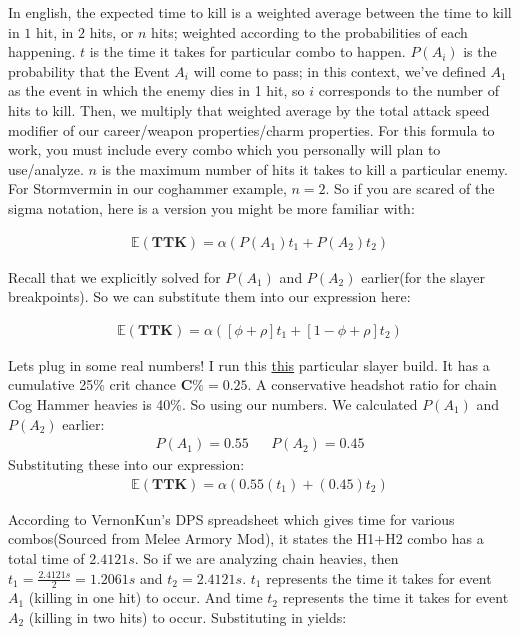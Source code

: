 \documentclass{article}
\begin{document}
In english, the expected time to kill is a weighted average between the time to kill in $1$ hit, in $2$ hits, or $n$ hits; weighted according to the probabilities of each happening. $t$ is the time it takes for particular combo to happen. $P(A_i)$ is the probability that the Event $A_i$ will come to pass; in this context, we've defined $A_1$ as the event in which the enemy dies in 1 hit, so $i$ corresponds to the number of hits to kill. Then, we multiply that weighted average by the total attack speed modifier of our career/weapon properties/charm properties. For this formula to work, you must include every combo which you personally will plan to use/analyze. $n$ is the maximum number of hits it takes to kill a particular enemy. For Stormvermin in our coghammer example, $n=2$. So if you are scared of the sigma notation, here is a version you might be more familiar with:

\begin{align*}
\mathbb{E}(\mathbf{TTK}) = \alpha (P(A_1) t_1 + P(A_2) t_2)
\end{align*}

Recall that we explicitly solved for $P(A_1)$ and $P(A_2)$ earlier(for the slayer breakpoints). So we can substitute them into our expression here:

\begin{align*}
\mathbb{E}(\mathbf{TTK}) = \alpha ([\phi + \rho] t_1 + [1-\phi+ \rho] t_2)
\end{align*}

Lets plug in some real numbers! I run this \href{https://www.ranalds.gift/build/IKtCgpNH7INsPonDHAHZ/view}{this} particular slayer build. It has a cumulative 25\% crit chance $\mathbf{C\%} = 0.25$. A conservative headshot ratio for chain Cog Hammer heavies is 40\%. So using our numbers. We calculated $P(A_1)$ and $P(A_2)$ earlier:
\begin{align*}
P(A_1) = 0.55 && P(A_2) = 0.45
\end{align*}
Substituting these into our expression:
\begin{align*}
\mathbb{E}(\mathbf{TTK}) = \alpha (0.55 (t_1) + (0.45) t_2)
\end{align*}

According to VernonKun's DPS spreadsheet which gives time for various combos(Sourced from Melee Armory Mod), it states the H1+H2 combo has a total time of $2.4121 s$. So if we are analyzing chain heavies, then $t_1=\tfrac{2.4121 s}{2}=1.2061 s$ and $t_2 = 2.4121 s$. $t_1$ represents the time it takes for event $A_1$ (killing in one hit) to occur. And time $t_2$ represents the time it takes for event $A_2$ (killing in two hits) to occur. Substituting in yields:
\end{document}
